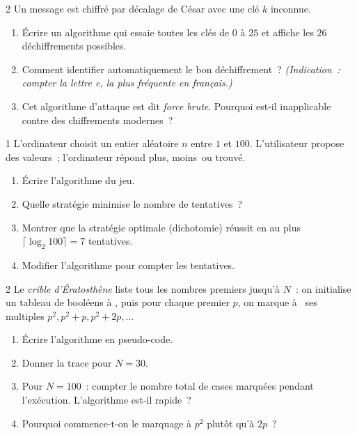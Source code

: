 \begin{probleme}{2}
Un message est chiffr\'e par d\'ecalage de C\'esar avec une cl\'e $k$ inconnue.
\begin{enumerate}
  \item \'Ecrire un algorithme qui essaie toutes les cl\'es de $0$ \`a $25$
        et affiche les $26$ d\'echiffrements possibles.
  \item Comment identifier automatiquement le bon d\'echiffrement~?
        \emph{(Indication~: compter la lettre \og e\fg, la plus fr\'equente
        en fran\c cais.)}
  \item Cet algorithme d'attaque est dit \emph{force brute}. Pourquoi
        est-il inapplicable contre des chiffrements modernes~?
\end{enumerate}
\end{probleme}

\begin{probleme}{1}
L'ordinateur choisit un entier al\'eatoire $n$ entre $1$ et $100$.
L'utilisateur propose des valeurs~; l'ordinateur r\'epond
\og plus\fg, \og moins\fg\ ou \og trouv\'e\fg.
\begin{enumerate}
  \item \'Ecrire l'algorithme du jeu.
  \item Quelle strat\'egie minimise le nombre de tentatives~?
  \item Montrer que la strat\'egie optimale (dichotomie) r\'eussit
        en au plus $\lceil\log_2 100\rceil = 7$ tentatives.
  \item Modifier l'algorithme pour compter les tentatives.
\end{enumerate}
\end{probleme}

\begin{probleme}{2}
Le \emph{crible d'\'Eratosth\`ene} liste tous les nombres premiers
jusqu'\`a $N$~: on initialise un tableau de bool\'eens \`a \vrai,
puis pour chaque premier $p$, on marque \`a \faux\ ses multiples
$p^2, p^2+p, p^2+2p, \ldots$
\begin{enumerate}
  \item \'Ecrire l'algorithme en pseudo-code.
  \item Donner la trace pour $N=30$.
  \item Pour $N=100$~: compter le nombre total de cases marqu\'ees
        pendant l'ex\'ecution. L'algorithme est-il rapide~?
  \item Pourquoi commence-t-on le marquage \`a $p^2$ plut\^ot qu'\`a $2p$~?
\end{enumerate}
\end{probleme}

